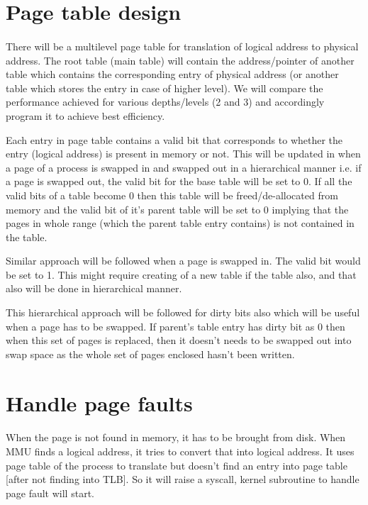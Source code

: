 \documentclass[11pt]{article}
\begin{document}
\section{Page table design}
\paragraph{}

There will be a multilevel page table for translation of logical address to physical address. The root table (main table) will contain the address/pointer of another table which contains the corresponding entry of physical address (or another table which stores the entry in case of higher level). We will compare the performance achieved for various depths/levels (2 and 3) and accordingly program it to achieve best efficiency.


Each entry in page table contains a valid bit that corresponds to whether the entry (logical address) is present in memory or not. This will be updated in when a page of a process is swapped in and swapped out in a hierarchical manner i.e. if a page is swapped out, the valid bit for the base table will be set to 0. If all the valid bits of a table become 0 then this table will be freed/de-allocated from memory and the valid bit of it's parent table will be set to 0 implying that the pages in whole range (which the parent table entry contains) is not contained in the table.


Similar approach will be followed when a page is swapped in. The valid bit would be set to 1. This might require creating of a new table if the table also, and that also will be done in hierarchical manner.

This hierarchical approach will be followed for dirty bits also which will be useful when a page has to be swapped. If parent's table entry has dirty bit as 0 then when this set of pages is replaced, then it doesn't needs to be swapped out into swap space as the whole set of pages enclosed hasn't been written.


\section{Handle page faults}
\paragraph{}
When the page is not found in memory, it has to be brought from 
disk. When MMU finds a logical address, it tries to convert that into logical address. It uses page table of the process to translate but doesn't find an entry into page table [after not finding into TLB]. So it will raise a syscall, kernel subroutine to handle page fault will start. 
\end{document}
